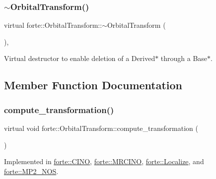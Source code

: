 \mbox{\label{classforte_1_1_orbital_transform_a5f537fe91199aaa005c923f32ec7d1ee}} 
\subsubsection{\texorpdfstring{$\sim$\+Orbital\+Transform()}{~OrbitalTransform()}}
{\footnotesize\ttfamily virtual forte\+::\+Orbital\+Transform\+::$\sim$\+Orbital\+Transform (\begin{DoxyParamCaption}{ }\end{DoxyParamCaption})\hspace{0.3cm}{\ttfamily [virtual]}, {\ttfamily [default]}}



Virtual destructor to enable deletion of a Derived$\ast$ through a Base$\ast$. 



\subsection{Member Function Documentation}
\mbox{\label{classforte_1_1_orbital_transform_a48704cbce9fd066ef7e58270bb413c25}} 
\subsubsection{\texorpdfstring{compute\+\_\+transformation()}{compute\_transformation()}}
{\footnotesize\ttfamily virtual void forte\+::\+Orbital\+Transform\+::compute\+\_\+transformation (\begin{DoxyParamCaption}{ }\end{DoxyParamCaption})\hspace{0.3cm}{\ttfamily [pure virtual]}}



Implemented in \mbox{\hyperlink{classforte_1_1_c_i_n_o_a8ac65e808e51c30f613cea8fcdbec851}{forte\+::\+C\+I\+NO}}, \mbox{\hyperlink{classforte_1_1_m_r_c_i_n_o_a0011f9c5bf52e26c96c3283beca3355a}{forte\+::\+M\+R\+C\+I\+NO}}, \mbox{\hyperlink{classforte_1_1_localize_af4858fdaa807659ad06d30925038a4c1}{forte\+::\+Localize}}, and \mbox{\hyperlink{classforte_1_1_m_p2___n_o_s_a3c093d2809477add44a5d3df9df56587}{forte\+::\+M\+P2\+\_\+\+N\+OS}}.

